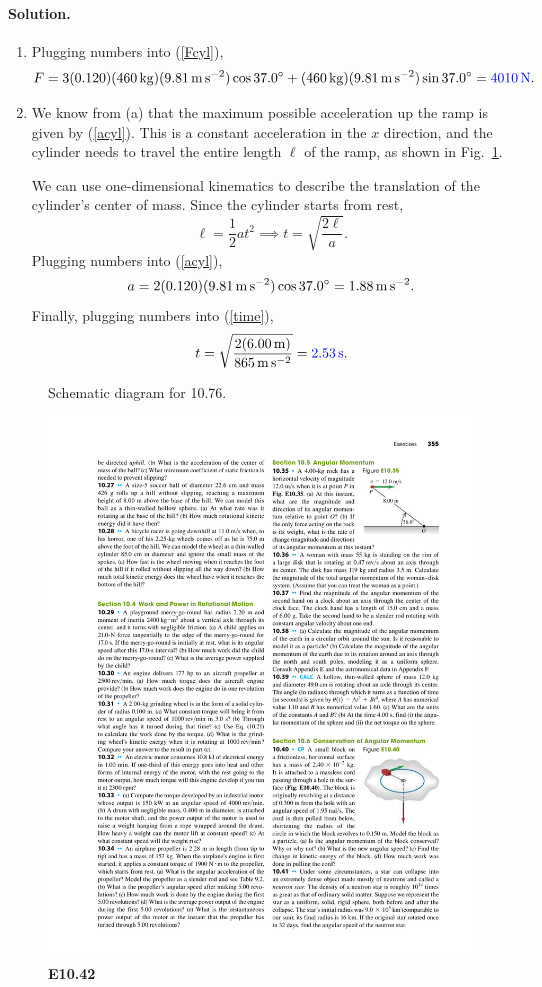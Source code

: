 \documentclass[11pt]{article}
\newcommand{\refeq}[1]{(\ref{#1})}
\newcommand{\beq}{\begin{equation*}}
\newcommand{\eeq}{\end{equation*}}
\newcommand{\beqn}{\begin{equation}}
\newcommand{\eeqn}{\end{equation}}
\newenvironment{solution}
{
    \paragraph{Solution.}
    \ignorespaces
}
{
    \bigskip
}
\begin{document}
\begin{solution}
	\begin{enumerate}
		\item Plugging numbers into \refeq{Fcyl},
			\beq
				F = 3 (0.120) (\SI{460}{\kg}) (\sig) \cos{37.0^\circ} + (\SI{460}{\kg}) (\sig) \sin{37.0^\circ} = {\color{blue} \SI{4010}{\newton}}.
			\eeq
			
		\item We know from (a) that the maximum possible acceleration up the ramp is given by \refeq{acyl}.  This is a constant acceleration in the $x$ direction, and the cylinder needs to travel the entire length $\ell$ of the ramp, as shown in Fig.~\ref{P10.76c}.
		
			We can use one-dimensional kinematics to describe the translation of the cylinder's center of mass.  Since the cylinder starts from rest,
			\beqn \label{time}
				\ell = \frac{1}{2} a t^2 \implies t = \sqrt{\frac{2 \ell}{a}}.
			\eeqn
			Plugging numbers into \refeq{acyl},
			\beq
				a = 2 (0.120) (\sig) \cos{37.0^\circ} = \SI{1.88}{\meter\per\square\second}.
			\eeq
			Finally, plugging numbers into \refeq{time},
			\beq
				t = \sqrt{\frac{2 (\SI{6.00}{\meter})}{\SI{865}{\meter\per\square\second}}} = {\color{blue} \SI{2.53}{\second}}.
			\eeq
	\end{enumerate}
\end{solution}

\begin{figure}[b]
	\caption{Schematic diagram for 10.76.}
	\label{P10.76c}
\end{figure}


\clearpage
\begin{figure} \centering
	\includegraphics{E10-42}
	\caption{\textbf{E10.42}}
	\label{E10.42}
\end{figure}
\end{document}
